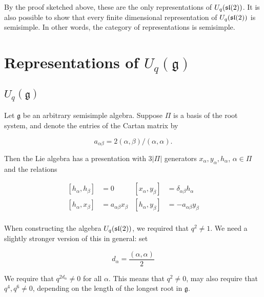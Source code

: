 By the proof sketched above, these are the only representations of
$U_q(\mathfrak{sl}(2))$. It is also possible to show that every finite dimensional
representation of $U_q(\mathfrak{sl}(2))$ is semisimple. In other words, the category of
representations is semisimple.

\section{Representations of $U_q(\mathfrak{g})$}
    \subsection{$U_q(\mathfrak{g})$}


        Let $\mathfrak{g}$ be an arbitrary semisimple algebra. Suppose $\Pi$ is
        a basis of the root system, and denote the entries of the Cartan matrix
        by 

        \begin{equation}
            a_{\alpha\beta} = 2(\alpha, \beta) / (\alpha, \alpha).
        \end{equation}

        Then the Lie algebra has a presentation with $3|\Pi|$ generators
        $x_\alpha, y_\alpha, h_\alpha$, $\alpha \in \Pi$ and the relations 

        \begin{align}
            \left[ h_\alpha, h_\beta \right] &= 0       &   \left[ x_\alpha, y_\beta \right] &= \delta_{\alpha\beta} h_\alpha \\
            \left[ h_\alpha, x_\beta \right] &= a_{\alpha\beta} x_\beta  &   \left[ h_\alpha, y_\beta \right] &= -a_{\alpha\beta} y_\beta \\
        \end{align}

        When constructing the algebra $U_q(\mathfrak{sl}(2))$, we required that $q^2
        \neq 1$. We need a slightly stronger version of this in general: set

        \begin{equation}
            d_\alpha = \frac{(\alpha, \alpha)}{2}
        \end{equation}

        We require that $q^{2d_{\alpha}} \neq 0$ for all $\alpha$. This means
        that $q^2 \neq 0$, may also require that $q^4, q^6 \neq 0$, depending
        on the length of the longest root in $\mathfrak{g}$.

